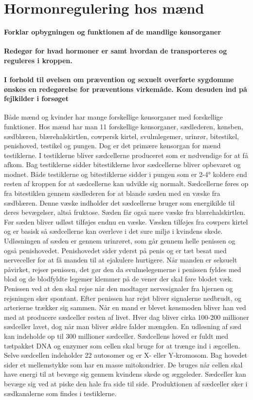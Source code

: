 \newpage
\part{Hormonregulering hos mænd}
\subsection*{Forklar opbygningen og funktionen af de mandlige kønsorganer}
\subsection*{Redegør for hvad hormoner er samt hvordan de transporteres og reguleres i kroppen.}
\subsection*{I forhold til øvelsen om prævention og sexuelt overførte sygdomme ønskes en redegørelse for præventions virkemåde. Kom desuden ind på fejlkilder i forsøget}Både mænd og kvinder har mange forskellige kønsorganer med forskellige funktioner. Hos mænd har man 11 forskellige kønsorganer, sædlederen, kønsben, sædblæren, blærehalskirtlen, cowpersk kirtel, svulmlegemer, urinrør, bitestikel, penishoved, testikel og pungen. Dog er det primære kønsorgan for mænd testiklerne. I testiklerne bliver sædcellerne produceret som er nødvendige for at få afkom. Bag testiklerne sidder bitestiklerne hvor sædcellerne bliver opbevaret og modnet. Både testiklerne og bitestiklerne sidder i pungen som er 2-4° koldere end resten af kroppen for at sædcellerne kan udvikle sig normalt. Sædcellerne føres op fra bitestiklen gennem sædlederen for at blande sæden med en væske fra sædblæren. Denne væske indholder det sædcellerne bruger som energikilde til deres bevægelser, altså fruktose. Sæden får også mere væske fra blærehalskirtlen. Før sæden bliver udløst tilføjes endnu en væske. Væsken tilføjes fra cowpers kirtel og er basisk så sædcellerne kan overleve i det sure miljø i kvindens skede. Udløsningen af sæden er gennem urinrøret, som går gennem helle penissen og også penishovedet. Penishovedet sider yderst på penis og er tæt besat med nerveceller for at få manden til at ejakulere hurtigere. Når manden er seksuelt påvirket, rejser penissen, det gør den da svulmelegemerne i penissen fyldes med blod og de blodfyldte legemer klemmer på de vener der skal føre blodet væk. Penissen ved at den skal rejse når den modtager nervesignaler fra hjernen og rejsningen sker spontant. Efter penissen  har rejst bliver signalerne nedbrudt, og arterierne trækker sig sammen. 
Når en mand er blevet kønsmoden bliver han ved med at producere sædceller resten af livet. Hver dag bliver cirka 100-200 millioner sædceller lavet, dog når man bliver ældre falder mængden. En udløsning af sæd kan indeholde op til 300 millioner sædceller. Sædcellens hoved er fuldt med tætpakket DNA og enzymer som cellen skal bruge for at trænge ind i ægcellen. Selve sædcellen indeholder 22 autosomer og er X- eller Y-kromosom. Bag hovedet sider et mellemstykke som har en masse mitokondrier. De bruges når cellen skal have energi til at bevæge sig gennem kvindens skede og æggeleder. Sædceller kan bevæge sig ved at piske den hale fra side til side. Produktionen af sædceller sker i sædkanalerne som findes i testiklerne.

